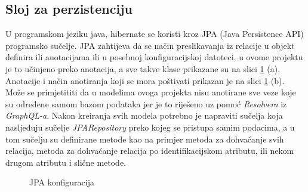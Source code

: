 \documentclass[times, utf8, zavrsni]{fer}
\begin{document}
\subsection{Sloj za perzistenciju}
U programskom jeziku java, hibernate se koristi kroz JPA (Java Persistence API) programsko sučelje.
JPA zahtijeva da se način preslikavanja iz relacije u objekt definira ili anotacijama
ili u posebnoj konfiguracijskoj datoteci, u ovome projektu je to učinjeno preko anotacija, a sve takve klase prikazane su na
slici \ref{fig:JPA} (a). Anotacije i način anotiranja koji se mora poštivati prikazan je na slici \ref{fig:JPA} (b). Može se primjetititi
da u modelima ovoga projekta nisu anotirane sve veze koje su određene samom bazom podataka
jer je to riješeno uz pomoć \textit{Resolvera} iz \textit{GraphQL-a}. Nakon kreiranja svih modela potrebno je napraviti sučelja koja nasljeđuju sučelje
\textit{JPARepository} preko kojeg se pristupa samim podacima, a u tom sučelju su definirane metode kao na primjer metoda
za dohvaćanje svih relacija, metoda za dohvaćanje relacija po identifikacijskom atributu, ili nekom drugom atributu
i slične metode.
\begin{figure}[h]
      \centering
      \caption{JPA konfiguracija}
      \label{fig:JPA}
\end{figure}
\end{document}
